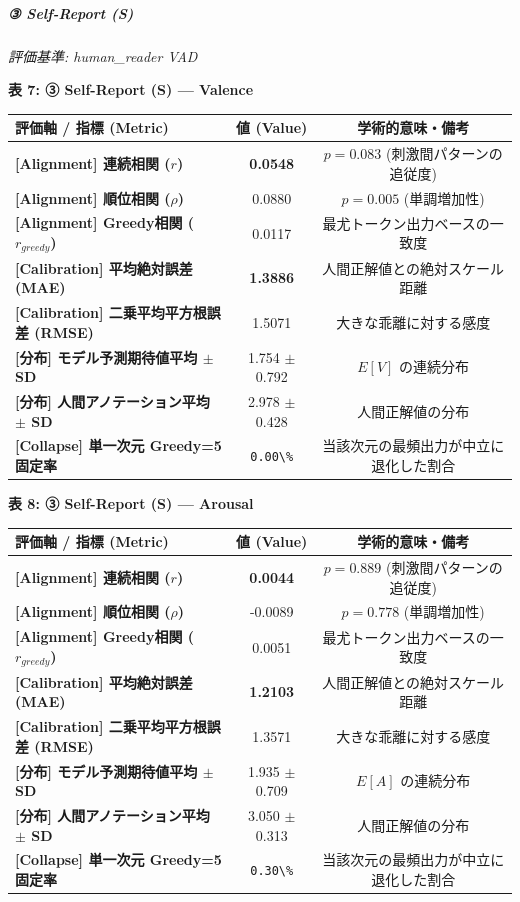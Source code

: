 \subparagraph{③ Self-Report (S)}
\textit{評価基準: human\_reader VAD}

\textbf{表 7: ③ Self-Report (S) — Valence}
\begin{center}
\small
\begin{tabular}{lcc}
\toprule
\textbf{評価軸 / 指標 (Metric)} & \textbf{値 (Value)} & \textbf{学術的意味・備考} \\
\midrule
\textbf{[Alignment] 連続相関 ($r$)} & \textbf{0.0548} & $p = 0.083 $ (刺激間パターンの追従度) \\
\textbf{[Alignment] 順位相関 ($\rho$)} & 0.0880 & $p = 0.005 $ (単調増加性) \\
\textbf{[Alignment] Greedy相関 ($r_{greedy}$)} & 0.0117 & 最尤トークン出力ベースの一致度 \\
\textbf{[Calibration] 平均絶対誤差 (MAE)} & \textbf{1.3886} & 人間正解値との絶対スケール距離 \\
\textbf{[Calibration] 二乗平均平方根誤差 (RMSE)} & 1.5071 & 大きな乖離に対する感度 \\
\textbf{[分布] モデル予測期待値平均 $\pm$ SD} & 1.754 $\pm$ 0.792 & $E[V]$ の連続分布 \\
\textbf{[分布] 人間アノテーション平均 $\pm$ SD} & 2.978 $\pm$ 0.428 & 人間正解値の分布 \\
\textbf{[Collapse] 単一次元 Greedy=5 固定率} & \texttt{0.00\textbackslash{}\%} & 当該次元の最頻出力が中立に退化した割合 \\
\bottomrule
\end{tabular}
\end{center}


\textbf{表 8: ③ Self-Report (S) — Arousal}
\begin{center}
\small
\begin{tabular}{lcc}
\toprule
\textbf{評価軸 / 指標 (Metric)} & \textbf{値 (Value)} & \textbf{学術的意味・備考} \\
\midrule
\textbf{[Alignment] 連続相関 ($r$)} & \textbf{0.0044} & $p = 0.889 $ (刺激間パターンの追従度) \\
\textbf{[Alignment] 順位相関 ($\rho$)} & -0.0089 & $p = 0.778 $ (単調増加性) \\
\textbf{[Alignment] Greedy相関 ($r_{greedy}$)} & 0.0051 & 最尤トークン出力ベースの一致度 \\
\textbf{[Calibration] 平均絶対誤差 (MAE)} & \textbf{1.2103} & 人間正解値との絶対スケール距離 \\
\textbf{[Calibration] 二乗平均平方根誤差 (RMSE)} & 1.3571 & 大きな乖離に対する感度 \\
\textbf{[分布] モデル予測期待値平均 $\pm$ SD} & 1.935 $\pm$ 0.709 & $E[A]$ の連続分布 \\
\textbf{[分布] 人間アノテーション平均 $\pm$ SD} & 3.050 $\pm$ 0.313 & 人間正解値の分布 \\
\textbf{[Collapse] 単一次元 Greedy=5 固定率} & \texttt{0.30\textbackslash{}\%} & 当該次元の最頻出力が中立に退化した割合 \\
\bottomrule
\end{tabular}
\end{center}


